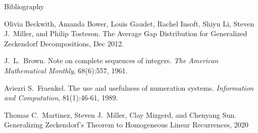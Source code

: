 \documentclass[handout]{beamer}
\begin{document}
\begin{frame}{Bibliography}
\begin{thebibliography}{BBGILMT}

	 Olivia Beckwith, Amanda Bower, Louis Gaudet, Rachel Insoft, Shiyu Li, Steven J.\ Miller, and Philip Tosteson. The Average Gap Distribution for Generalized Zeckendorf Decompositions, Dec 2012.
	
	 J.\ L.\ Brown. Note on complete sequences of integers. \emph{The  American  Mathematical  Monthly}, 68(6):557, 1961.
	
	 Aviezri S.\ Fraenkel. The use and usefulness of numeration systems. \emph{Information and Computation}, 81(1):46-61, 1989.
	
	 Thomas C.\ Martinez, Steven J.\ Miller, Clay Mizgerd, and Chenyang Sun. Generalizing Zeckendorf's Theorem to Homogeneous Linear Recurrences, 2020
	
	
\end{thebibliography}
\end{frame}
\end{document}
